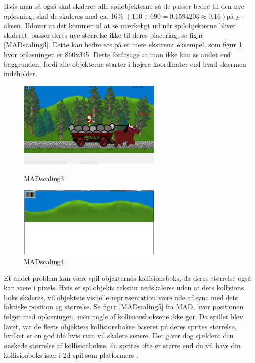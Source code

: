 \documentclass[Main.tex]{PositionOgSkalering}
\begin{document}
Hvis man så også skal skalerer alle spilobjekterne så de passer bedre til den nye opløsning, skal de skaleres med ca. 16\% \begin{math} (110 \div 690  = 0.1594203 \approx 0.16) \end{math}på y-aksen. Udover at det kommer til at se mærkeligt ud når spilobjekterne bliver skaleret, passer deres nye størrelse ikke til deres placering, se figur \ref{MADscaling3}. Dette kan bedre ses på et mere ekstremt eksempel, som figur \ref{MADscaling4} hvor opløsningen er 860x345. Dette forårsage at man ikke kan se andet end baggrunden, fordi alle objekterne starter i højere koordinater end hvad skærmen indeholder.

\begin{figure}[h]
\centering
\parbox{7cm}{   
\includegraphics[width = 7cm]{billeder/MADscaling3}
\caption{MADscaling3}    
\label{MADscaling3}}
\qquad
\begin{minipage}{7cm}
\includegraphics[width = 7cm]{billeder/MADscaling4}
\caption{MADscaling4}    
\label{MADscaling4}
\end{minipage}
\end{figure}

Et andet problem kan være spil objekternes kollisionsboks, da deres størrelse også kan være i pixels. Hvis et spilobjekts tekstur nedskaleres uden at dets kollisions boks skaleres, vil objektets visuelle repræsentation være ude af sync med dets faktiske position og størrelse. Se figur \ref{MADscaling5} fra MAD, hvor positionen følger med opløsningen, men nogle af kollisionsboksene ikke gør. Da spillet blev lavet, var de fleste objekters kollisionsbokse baseret på deres sprites størrelse, hvilket er en god idé hvis man vil skalere senere. 
Det giver dog sjældent den ønskede størrelse af kollisionbokse, da sprites ofte er større end du vil have din kollisionboks især i 2d spil som platformers  \cite{Jonkers}.
\end{document}
